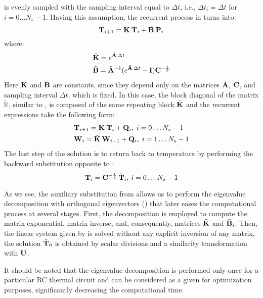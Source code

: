  is evenly sampled with the sampling interval equal to $\Delta t$, i.e., $\Delta t_i = \Delta t$ for $i = 0 \dots N_s - 1$. Having this assumption, the recurrent process in  turns into:
\[
  \tilde{\mathbf{T}}_{i+1} = \tilde{\mathbf{K}} \: \tilde{\mathbf{T}}_i + \tilde{\mathbf{B}} \: \mathbf{P}_i
\]
where:
\begin{align*}
  & \tilde{\mathbf{K}} = e^{\tilde{\mathbf{A}} \: \Delta t} \\
  & \tilde{\mathbf{B}} = \tilde{\mathbf{A}}^{-1} ( e^{\tilde{\mathbf{A}} \: \Delta t} - \mathbf{I} ) \mathbf{C}^{-\frac{1}{2}}
\end{align*}
Here $\tilde{\mathbf{K}}$ and $\tilde{\mathbf{B}}$ are constants, since they depend only on the matrices $\tilde{\mathbf{A}}$, $\mathbf{C}$, and sampling interval $\Delta t$, which is fixed. In this case, the block diagonal of the matrix $\tilde{\mathbb{K}}$, similar to , is composed of the same repeating block $\tilde{\mathbf{K}}$ and the recurrent expressions take the following form:
\begin{align}
  & \tilde{\mathbf{T}}_{i + 1} = \tilde{\mathbf{K}} \: \tilde{\mathbf{T}}_i + \mathbf{Q}_i, \; i = 0 \dots N_s - 1 \nonumber \\
  & \mathbf{W}_i = \tilde{\mathbf{K}} \: \mathbf{W}_{i - 1} + \mathbf{Q}_i, \; i = 1 \dots N_s - 1 \nonumber
\end{align}
The last step of the solution is to return back to temperature by performing the backward substitution opposite to :
\[
  \mathbf{T}_i = \mathbf{C}^{-\frac{1}{2}} \: \tilde{\mathbf{T}}_i, \: i = 0 \dots N_s - 1
\]

As we see, the auxiliary substitution from  allows us to perform the eigenvalue decomposition with orthogonal eigenvectors () that later eases the computational process at several stages. First, the decomposition is employed to compute the matrix exponential, matrix inverse, and, consequently, matrices $\tilde{\mathbf{K}}$ and $\tilde{\mathbf{B}}_i$. Then, the linear system given by  is solved without any explicit inversion of any matrix, the solution $\tilde{\mathbf{T}}_0$ is obtained by scalar divisions and a similarity transformation with $\mathbf{U}$.

It should be noted that the eigenvalue decomposition is performed only once for a particular RC thermal circuit and can be considered as a given for optimization purposes, significantly decreasing the computational time.
